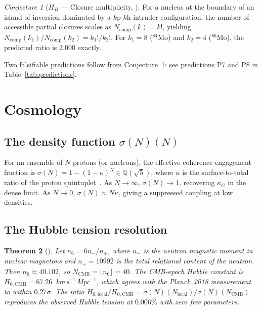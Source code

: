 \documentclass[11pt,a4paper]{article}
\theoremstyle{plain}
\newtheorem{theorem}{Theorem}[section]
\theoremstyle{definition}
\theoremstyle{remark}
\newtheorem{conjecture}[theorem]{Conjecture}
\newcommand{\sigmaN}{\sigma(N)}
\begin{document}
\begin{conjecture}[$H_B$ --- Closure multiplicity, \cite{D41}]
\label{conj:HB}
For a nucleus at the boundary of an island of inversion dominated by a $k$p-$k$h intruder configuration, the number of accessible partial closures scales as $N_{\mathrm{comp}}(k)=k!$, yielding $N_{\mathrm{comp}}(k_1)/N_{\mathrm{comp}}(k_2)=k_1!/k_2!$. For $k_1=8$ ($^{84}$Mo) and $k_2=4$ ($^{86}$Mo), the predicted ratio is $2.000$ exactly.
\end{conjecture}

Two falsifiable predictions follow from Conjecture~\ref{conj:HB}: see predictions P7 and P8 in Table~\ref{tab:predictions}.

\section{Cosmology}
\label{sec:cosmology}

\subsection{The density function \texorpdfstring{$\sigmaN(N)$}{sigmaN(N)}}
\label{subsec:sigma}
For an ensemble of $N$ protons (or nucleons), the effective coherence engagement fraction is $\sigmaN=1-(1-\kappa)^N\in\mathbb{Q}(\sqrt{5})$, where $\kappa$ is the surface-to-total ratio of the proton quintuplet~\cite{D24,D26}. As $N\to\infty$, $\sigmaN\to 1$, recovering $\kappa_G$ in the dense limit. As $N\to0$, $\sigmaN\approx N\kappa$, giving a suppressed coupling at low densities.

\subsection{The Hubble tension resolution}
\label{subsec:hubble}
\begin{theorem}[\cite{D27,D35}]
\label{thm:hubble}
Let $n_6=6n_-/n_+$, where $n_-$ is the neutron magnetic moment in nuclear magnetons and $n_{+}=10992$ is the total relational content of the neutron. Then $n_6\approx 40.102$, so $N_{\mathrm{CMB}}=\lfloor n_6\rfloor=40$. The CMB-epoch Hubble constant is $H_{0,\mathrm{CMB}}=67.26$~km\,s$^{-1}$\,Mpc$^{-1}$, which agrees with the Planck~2018 measurement to within $0.27\sigma$. The ratio $H_{0,\mathrm{local}}/H_{0,\mathrm{CMB}}=\sigmaN(N_{\mathrm{local}})/\sigmaN(N_{\mathrm{CMB}})$ reproduces the observed Hubble tension at $0.006\%$ with zero free parameters.
\end{theorem} 
\end{document}
